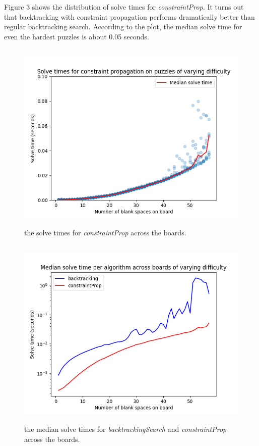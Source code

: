 \documentclass[12pt]{article}
\begin{document}
	Figure 3 shows the distribution of solve times for \textit{constraintProp}. It turns out that backtracking with constraint propagation performs dramatically better than regular backtracking search. According to the plot, the median solve time for even the hardest puzzles is about 0.05 seconds. 
	
	\begin{figure}[h]
	\centering
	\includegraphics[height=3.65in]{figure3.png}
	\caption{the solve times for \textit{constraintProp} across the boards.}
	\end{figure}
	
	\begin{figure}[h]
	\centering
	\includegraphics[height=3.65in]{figure4.png}
	\caption{the median solve times for \textit{backtrackingSearch} and \textit{constraintProp} across the boards.}
	\end{figure}\\
	
\end{document}
